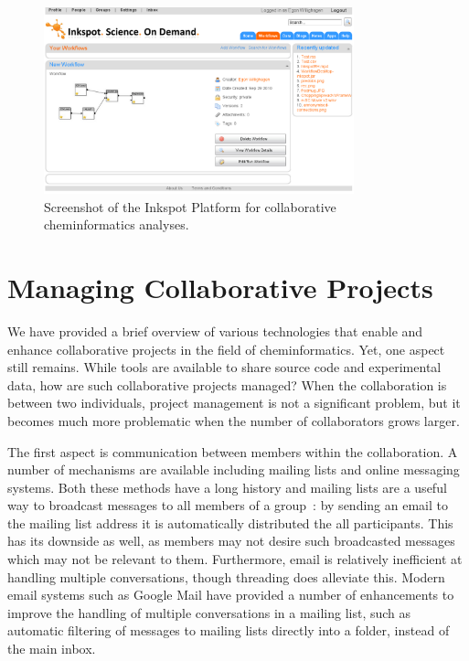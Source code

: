 \documentclass[11pt]{book}
\begin{document}
\begin{figure}[bt]
\begin{center}
\includegraphics[width=0.8\textwidth]{graphics/inkspot.png}
\end{center}
\caption{Screenshot of the Inkspot Platform for collaborative
cheminformatics analyses.}
\label{fig:inkspot}
\end{figure}


\section{Managing Collaborative Projects}

We have provided a brief overview of various technologies that enable
and enhance collaborative projects in the field of
cheminformatics. Yet, one aspect still remains. While tools are
available to share source code and experimental data, how are such
collaborative projects managed? When the collaboration is between two
individuals, project management is not a significant problem, but it
becomes much more problematic when the number of collaborators grows
larger.

The first aspect is communication between members within the
collaboration. A number of mechanisms are available including mailing
lists and online messaging systems. Both these methods have a long
history and mailing lists are a useful way to broadcast messages to
all members of a group~\cite{wp:mailinglist}:
by sending an email to the mailing list address
it is automatically distributed the all participants.
This has its downside as well, as members
may not desire such broadcasted messages which may not be
relevant to them. Furthermore, email is
relatively inefficient at handling multiple conversations, though
threading does alleviate this. Modern email systems such as
Google Mail have provided a number of enhancements to improve the
handling of multiple conversations in a mailing list, such as
automatic filtering of messages to mailing lists directly into
a folder, instead of the main inbox.
\end{document}
